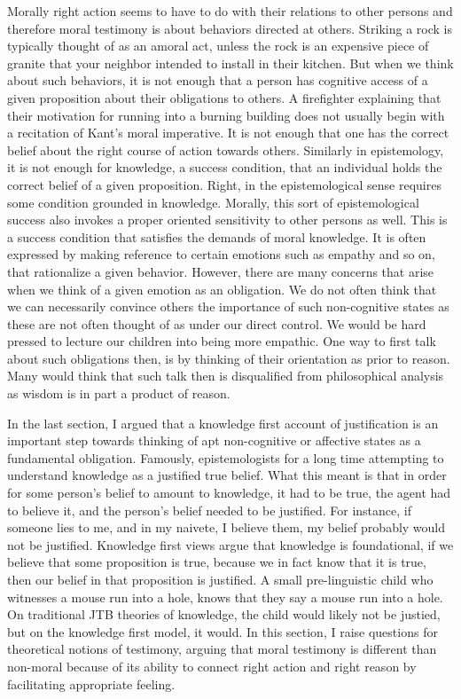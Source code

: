 \documentclass[phdthesis,12pt,final,a4paper]{wuthesis}
\theoremstyle{definition}
\theoremstyle{definition}
\theoremstyle{definition}
\theoremstyle{definition}
\theoremstyle{remark}
\begin{document}
Morally right action seems to have to do with their relations to other persons and therefore moral testimony is about behaviors directed at others. Striking a rock is typically thought of as an amoral act, unless the rock is an expensive piece of granite that your neighbor intended to install in their kitchen. But when we think about such behaviors, it is not enough that a person has cognitive access of a given proposition about their obligations to others. A firefighter explaining that their motivation for running into a burning building does not usually begin with a recitation of Kant's moral imperative. It is not enough that one has the correct belief about the right course of action towards others. Similarly in epistemology, it is not enough for knowledge, a success condition, that an individual holds the correct belief of a given proposition. Right, in the epistemological sense requires some condition grounded in knowledge. Morally, this sort of epistemological success also invokes a proper oriented sensitivity to other persons as well. This is a success condition that satisfies the demands of moral knowledge. It is often expressed by making reference to certain emotions such as empathy and so on, that rationalize a given behavior. However, there are many concerns that arise when we think of a given emotion as an obligation. We do not often think that we can necessarily convince others the importance of such non-cognitive states as these are not often thought of as under our direct control. We would be hard pressed to lecture our children into being more empathic. One way to first talk about such obligations then, is by thinking of their orientation as prior to reason. Many would think that such talk then is disqualified from philosophical analysis as wisdom is in part a product of reason.

In the last section, I argued that a knowledge first account of justification is an important step towards thinking of apt non-cognitive or affective states as a fundamental obligation. Famously, epistemologists for a long time attempting to understand knowledge as a justified true belief. What this meant is that in order for some person's belief to amount to knowledge, it had to be true, the agent had to believe it, and the person's belief needed to be justified. For instance, if someone lies to me, and in my naivete, I believe them, my belief probably would not be justified. Knowledge first views argue that knowledge is foundational, if we believe that some proposition is true, because we in fact know that it is true, then our belief in that proposition is justified. A small pre-linguistic child who witnesses a mouse run into a hole, knows that they say a mouse run into a hole. On traditional JTB theories of knowledge, the child would likely not be justied, but on the knowledge first model, it would. In this section, I raise questions for theoretical notions of testimony, arguing that moral testimony is different than non-moral because of its ability to connect right action and right reason by facilitating appropriate feeling.
\end{document}

